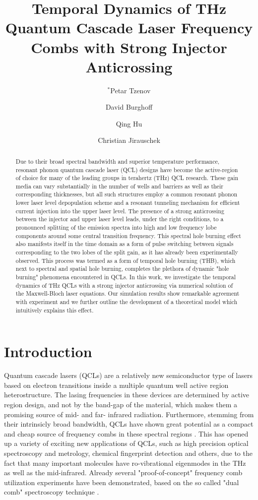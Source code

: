 \documentclass[]{spie}  %
\title{Temporal Dynamics of THz Quantum Cascade Laser
	Frequency Combs with Strong Injector Anticrossing}
\author[a]{$^*$Petar Tzenov}
\author[b]{David Burghoff}
\author[b]{Qing Hu}
\author[a]{Christian Jirauschek}
\affil[a]{Institute for Nanoelectronics, Technical University of Munich,
	D-80333 Munich, Germany}
\affil[b]{Department of Electrical Engineering
	and Computer Science, Research Laboratory of Electronics, Massachusetts
	Institute of Technology, Cambridge, Massachusetts 02139, USA}
\begin{document}
 
\maketitle


\begin{abstract}
	Due to their broad spectral bandwidth and superior temperature performance, resonant phonon quantum cascade laser (QCL) designs have become the active-region of choice for many of the leading groups in terahertz (THz) QCL research. These gain media can vary substantially in the number of wells and barriers as well as their corresponding thicknesses, but all such structures employ a common resonant phonon lower laser level depopulation scheme and a resonant tunneling mechanism for efficient current injection into the upper laser level. The presence of a strong anticrossing between the injector and upper laser level leads, under the right conditions, to a pronounced splitting of the emission spectra into high and low frequency lobe components around some central transition frequency. This spectral hole burning effect also manifests itself in the time domain as a form of pulse switching between signals corresponding to the two lobes of the split gain, as it has  already been experimentally observed. This process was termed as a form of temporal hole burning (THB), which next to spectral and spatial hole burning, completes the plethora of dynamic "hole burning" phenomena encountered in QCLs. In this work, we investigate the temporal dynamics of THz QCLs with a strong injector anticrossing via numerical solution of the Maxwell-Bloch laser equations. Our simulation results show remarkable agreement with experiment and we further outline the development of a theoretical model which intuitively explains this effect.
\end{abstract}



\section{Introduction}

Quantum cascade lasers (QCLs) are a relatively new semiconductor type of lasers based on electron transitions inside a multiple quantum well active region heterostructure. The lasing
frequencies in these devices are determined by active region design, and not by the band-gap of the material, which makes them a promising source of mid- and far- infrared radiation. Furthermore, stemming from their intrinsicly broad bandwidth, QCLs have shown great potential as a compact and cheap source of frequency combs in these spectral regions \cite{burghoff2014terahertz,hugi2012mid,rosch2015octave}. This has opened up a variety of exciting new applications of QCLs, such as high precision optical spectroscopy and metrology, chemical fingerprint detection and others, due to the fact that many important molecules have ro-vibrational eigenmodes in the THz as well as the mid-infrared. Already several "proof-of-concept" frequency comb utilization experiments have been demonstrated, based on the so called "dual comb" spectroscopy technique \cite{villares2014dual,yang2016terahertz}.
\end{document}
